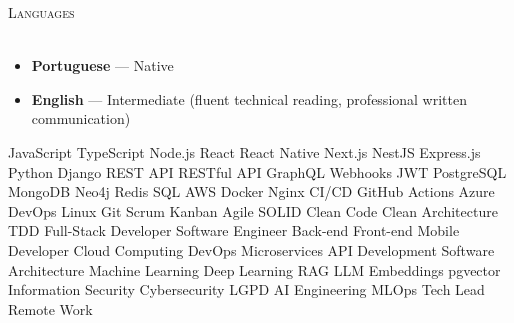 \documentclass[a4paper]{article}
\newcommand{\lineunder}{
    \vspace*{-8pt} \\
    \hspace*{-18pt} \hrulefill \\
}
\newcommand{\header}[1]{
    {\hspace*{-18pt}\vspace*{6pt} \textsc{#1}}
    \vspace*{-6pt} \lineunder
}
\begin{document}
\vspace{3mm}

\header{Languages}
\vspace{2mm}
\begin{itemize}[leftmargin=*, itemsep=-2pt]
    \item \textbf{Portuguese} — Native
    \item \textbf{English} — Intermediate (fluent technical reading, professional written communication)
\end{itemize}

\vspace{3mm}

{\tiny\color{white}
JavaScript TypeScript Node.js React React Native Next.js NestJS Express.js Python Django
REST API RESTful API GraphQL Webhooks JWT PostgreSQL MongoDB Neo4j Redis SQL
AWS Docker Nginx CI/CD GitHub Actions Azure DevOps Linux Git Scrum Kanban Agile
SOLID Clean Code Clean Architecture TDD Full-Stack Developer Software Engineer Back-end
Front-end Mobile Developer Cloud Computing DevOps Microservices API Development
Software Architecture Machine Learning Deep Learning RAG LLM Embeddings pgvector
Information Security Cybersecurity LGPD AI Engineering MLOps Tech Lead Remote Work
}
\end{document}
